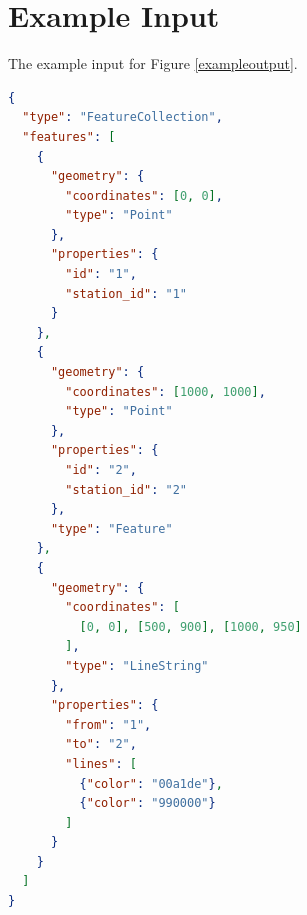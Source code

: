 \documentclass[10pt,a4paper]{article}
\begin{document}
\section{Example Input}
\label{exampleinput}

The example input for Figure \ref{exampleoutput}.

\begin{lstlisting}[language=json,firstnumber=1]
{
  "type": "FeatureCollection",
  "features": [
    {
      "geometry": {
        "coordinates": [0, 0],
        "type": "Point"
      },
      "properties": {
        "id": "1",
        "station_id": "1"
      }
    },
    {
      "geometry": {
        "coordinates": [1000, 1000],
        "type": "Point"
      },
      "properties": {
        "id": "2",
        "station_id": "2"
      },
      "type": "Feature"
    },
    {
      "geometry": {
        "coordinates": [
          [0, 0], [500, 900], [1000, 950]
        ],
        "type": "LineString"
      },
      "properties": {
        "from": "1",
        "to": "2",
        "lines": [
          {"color": "00a1de"},
          {"color": "990000"}
        ]
      }
    }
  ]
}
\end{lstlisting}
\end{document}

